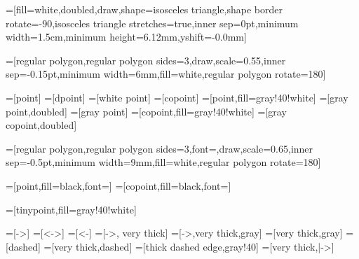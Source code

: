 =[fill=white,doubled,draw,shape=isosceles triangle,shape border rotate=-90,isosceles triangle stretches=true,inner sep=0pt,minimum width=1.5cm,minimum height=6.12mm,yshift=-0.0mm]

=[regular polygon,regular polygon sides=3,draw,scale=0.55,inner sep=-0.15pt,minimum width=6mm,fill=white,regular polygon rotate=180]

=[point]
=[dpoint]
=[white point] %
=[copoint]
=[point,fill=gray!40!white]
=[gray point,doubled]
=[gray point] %
=[copoint,fill=gray!40!white]
=[gray copoint,doubled]

=[regular polygon,regular polygon sides=3,font=\scriptsize,draw,scale=0.65,inner sep=-0.5pt,minimum width=9mm,fill=white,regular polygon rotate=180]

=[point,fill=black,font=\color{white}]
=[copoint,fill=black,font=\color{white}]

=[tinypoint,fill=gray!40!white]

=[->]
=[<->]
=[<-]
=[->, very thick]
=[->,very thick,gray]
=[very thick,gray]
=[dashed]
=[very thick,dashed]
=[thick dashed edge,gray!40]
=[very thick,|->]


\makeatletter
\newcommand{\boxshape}[3]{%
\pgfdeclareshape{#1}{
\inheritsavedanchors[from=rectangle] %
\inheritanchorborder[from=rectangle]
\inheritanchor[from=rectangle]{center}
\inheritanchor[from=rectangle]{north}
\inheritanchor[from=rectangle]{south}
\inheritanchor[from=rectangle]{west}
\inheritanchor[from=rectangle]{east}
\backgroundpath{%
\southwest \pgf@xa=\pgf@x \pgf@ya=\pgf@y
\northeast \pgf@xb=\pgf@x \pgf@yb=\pgf@y

\@tempdima=#2
\@tempdimb=#3

\pgfpathmoveto{\pgfpoint{\pgf@xa - 5pt + \@tempdima}{\pgf@ya}}
\pgfpathlineto{\pgfpoint{\pgf@xa - 5pt - \@tempdima}{\pgf@yb}}
\pgfpathlineto{\pgfpoint{\pgf@xb + 5pt + \@tempdimb}{\pgf@yb}}
\pgfpathlineto{\pgfpoint{\pgf@xb + 5pt - \@tempdimb}{\pgf@ya}}
\pgfpathlineto{\pgfpoint{\pgf@xa - 5pt + \@tempdima}{\pgf@ya}}
\pgfpathclose
}
}}

